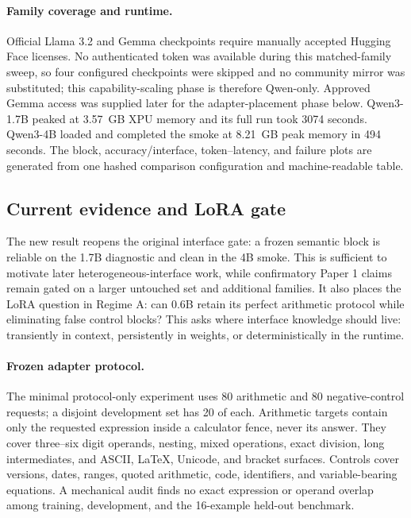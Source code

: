 \documentclass[11pt]{article}
\begin{document}
\paragraph{Family coverage and runtime.}
Official Llama 3.2 and Gemma checkpoints require manually accepted Hugging Face
licenses. No authenticated token was available during this matched-family sweep,
so four configured checkpoints were skipped and no community mirror was
substituted; this capability-scaling phase is therefore Qwen-only. Approved
Gemma access was supplied later for the adapter-placement phase below. Qwen3-1.7B
peaked at 3.57~GB XPU memory and its full run took 3074 seconds. Qwen3-4B loaded
and completed the smoke at 8.21~GB peak memory in 494 seconds. The block,
accuracy/interface, token--latency, and failure plots are generated from one
hashed comparison configuration and machine-readable table.

\subsection{Current evidence and LoRA gate}

The new result reopens the original interface gate: a frozen semantic block is
reliable on the 1.7B diagnostic and clean in the 4B smoke. This is sufficient to
motivate later heterogeneous-interface work, while confirmatory Paper 1 claims
remain gated on a larger untouched set and additional families. It also places
the LoRA question in Regime A: can 0.6B retain its perfect arithmetic protocol
while eliminating false control blocks? This asks where interface knowledge
should live: transiently in context, persistently in weights, or deterministically
in the runtime.

\paragraph{Frozen adapter protocol.}
The minimal protocol-only experiment uses 80 arithmetic and 80 negative-control requests;
a disjoint development set has 20 of each. Arithmetic targets contain only the
requested expression inside a calculator fence, never its answer. They cover
three--six digit operands, nesting, mixed operations, exact division, long
intermediates, and ASCII, LaTeX, Unicode, and bracket surfaces. Controls cover
versions, dates, ranges, quoted arithmetic, code, identifiers, and variable-bearing
equations. A mechanical audit finds no exact expression or operand overlap among
training, development, and the 16-example held-out benchmark.
\end{document}
